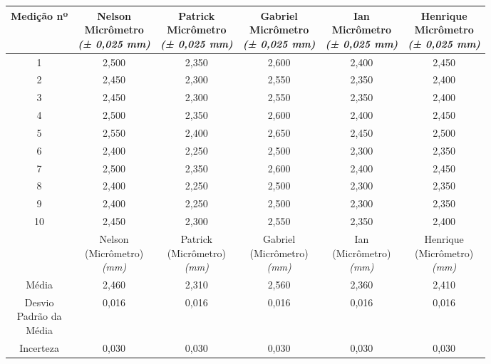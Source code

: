 \documentclass{article}
\begin{document}
\begin{table}[h!]
\centering
\begin{tabular}{c c c c c c }
\toprule
Medição nº & \shortstack{Nelson\\Micrômetro\\\textit{(± 0,025 mm)}} & \shortstack{Patrick\\Micrômetro\\\textit{(± 0,025 mm)}} & \shortstack{Gabriel\\Micrômetro\\\textit{(± 0,025 mm)}} & \shortstack{Ian\\Micrômetro\\\textit{(± 0,025 mm)}} & \shortstack{Henrique\\Micrômetro\\\textit{(± 0,025 mm)}}\\
\midrule
1 & 2,500 & 2,350 & 2,600 & 2,400 & 2,450\\
2 & 2,450 & 2,300 & 2,550 & 2,350 & 2,400\\
3 & 2,450 & 2,300 & 2,550 & 2,350 & 2,400\\
4 & 2,500 & 2,350 & 2,600 & 2,400 & 2,450\\
5 & 2,550 & 2,400 & 2,650 & 2,450 & 2,500\\
6 & 2,400 & 2,250 & 2,500 & 2,300 & 2,350\\
7 & 2,500 & 2,350 & 2,600 & 2,400 & 2,450\\
8 & 2,400 & 2,250 & 2,500 & 2,300 & 2,350\\
9 & 2,400 & 2,250 & 2,500 & 2,300 & 2,350\\
10 & 2,450 & 2,300 & 2,550 & 2,350 & 2,400\\
\midrule
&\shortstack{Nelson\\(Micrômetro)\\\textit{(mm)}} & \shortstack{Patrick\\(Micrômetro)\\\textit{(mm)}} & \shortstack{Gabriel\\(Micrômetro)\\\textit{(mm)}} & \shortstack{Ian\\(Micrômetro)\\\textit{(mm)}} & \shortstack{Henrique\\(Micrômetro)\\\textit{(mm)}}\\
\midrule
Média & 2,460 & 2,310 & 2,560 & 2,360 & 2,410\\[3pt]
\shortstack{Desvio\\Padrão da\\Média} & 0,016 & 0,016 & 0,016 & 0,016 & 0,016\\[3pt]
Incerteza & 0,030 & 0,030 & 0,030 & 0,030 & 0,030\\
\bottomrule
\end{tabular}
\end{table}
\end{document}
